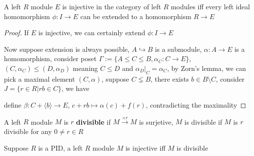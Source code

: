 \documentclass[../main.tex]{subfiles}
\begin{document}
\begin{theorem}\label{Baer's criterion}
A left $R$ module $E$ is injective in the category of left $R$ modules iff every left ideal homomorphism $\phi:I\to E$ can be extended to a homomorphism $R\to E$
\end{theorem}

\begin{proof}
If $E$ is injective, we can certainly extend $\phi:I\to E$
\begin{center}
\end{center}
Now suppose extension is always possible, $A\hookrightarrow B$ is a submodule, $\alpha:A\to E$ is a homomorphism, consider poset $\Gamma:=\{A\leq C\leq B,\alpha_C:C\to E\}$, $(C,\alpha_C)\leq(D,\alpha_D)$ meaning $C\leq D$ and $\alpha_D|_C=\alpha_C$, by Zorn's lemma, we can pick a maximal element $(C,\alpha)$, suppose $C\lneq B$, there exists $b\in B\setminus C$, consider $J=\{r\in R|rb\in C\}$, we have
\begin{center}
\end{center}
define $\beta:C+\langle b\rangle\to E$, $c+rb\mapsto\alpha(c)+f(r)$, contradicting the maximality
\end{proof}

\begin{definition}
A left $R$ module $M$ is $r$ \textbf{divisible} if $M\xrightarrow{\times r}M$ is surjetive, $M$ is divisible if $M$ is $r$ divisible for any $0\neq r\in R$
\end{definition}

\begin{corollary}\label{Injective <=> Divisible}
Suppose $R$ is a PID, a left $R$ module $M$ is injective iff $M$ is divisible
\end{corollary}
\end{document}
